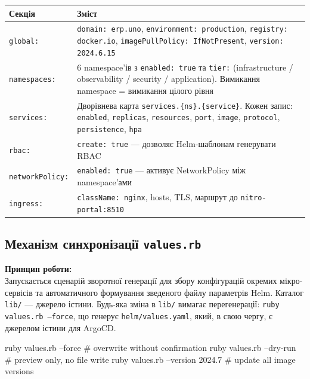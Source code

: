 \documentclass[12pt,a4paper]{article}
\let\originalfootnotesize\footnotesize
\let\oldverbatim\verbatim
\let\oldendverbatim\endverbatim
\renewenvironment{verbatim}{\originalfootnotesize\oldverbatim}{\oldendverbatim}
\begin{document}
\begin{longtable}{L{3.5cm} L{10.5cm}}
\toprule
{}
\color{primary}\textbf{Секція} & \color{primary}\textbf{Зміст} \\
\midrule\endhead\bottomrule\endfoot
\texttt{global:}
  & \texttt{domain: erp.uno}, \texttt{environment: production},
    \texttt{registry: docker.io}, \texttt{imagePullPolicy: IfNotPresent},
    \texttt{version: 2024.6.15} \\[4pt]
\texttt{namespaces:}
  & 6 namespace'ів з \texttt{enabled: true} та \texttt{tier:}
    (infrastructure / observability / security / application).
    Вимикання namespace = вимикання цілого рівня \\[4pt]
\texttt{services:}
  & Дворівнева карта \texttt{services.\{ns\}.\{service\}}.
    Кожен запис: \texttt{enabled}, \texttt{replicas}, \texttt{resources},
    \texttt{port}, \texttt{image}, \texttt{protocol}, \texttt{persistence},
    \texttt{hpa} \\[4pt]
\texttt{rbac:} & \texttt{create: true} --- дозволяє Helm-шаблонам генерувати RBAC \\[4pt]
\texttt{networkPolicy:} & \texttt{enabled: true} --- активує NetworkPolicy між namespace'ами \\[4pt]
\texttt{ingress:} & \texttt{className: nginx}, hosts, TLS, маршрут до \texttt{nitro-portal:8510} \\[4pt]
\end{longtable}

\newpage
\subsection{Механізм синхронізації \texttt{values.rb}}

\begin{tcolorbox}[notebox]
\textbf{Принцип роботи:}\\[4pt]
Запускається сценарiй зворотної генерацiї для збору конфiгурацiй окремих мiкро-
сервiсiв та автоматичного формування зведеного файлу параметрiв Helm.
Каталог \texttt{lib/} --- джерело істини. Будь-яка зміна в \texttt{lib/} вимагає
перегенерації: \texttt{ruby values.rb --force}, що генерує \texttt{helm/values.yaml},
який, в свою чергу, є джерелом істини для ArgoCD.
\end{tcolorbox}

\begin{verbatim}
ruby values.rb --force          # overwrite without confirmation
ruby values.rb --dry-run        # preview only, no file write
ruby values.rb --version 2024.7 # update all image versions
\end{verbatim}
\end{document}
